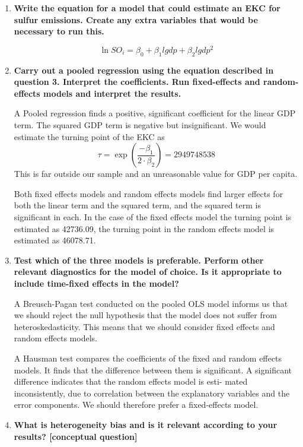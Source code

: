 \documentclass{scrartcl}
\begin{document}
\begin{enumerate}
	\item \textbf{Write the equation for a model that could estimate an EKC for sulfur emissions. Create any extra variables that would be necessary to run this.}
	
	\[ \ln{SO_i} = \beta_0 + \beta_1 lgdp + \beta_2 lgdp^2\]
	
	
	\item \textbf{Carry out a pooled regression using the equation described in question 3. Interpret the coefficients. Run fixed-effects and random-effects models and interpret the results.}

	
	
	A Pooled regression finds a positive, significant coefficient for the linear GDP term. The squared GDP term is negative but insignificant. We would estimate the turning point of the EKC as \[ \tau = \exp\left(\frac{-\beta_1}{2\cdot\beta_2}\right) = 2949748538 \] This is far outside our sample and an unreasonable value for GDP per capita.

	Both fixed effects models and random effects models find larger effects for both the linear term and the squared term, and the squared term is significant in each. In the case of the fixed effects model the turning point is estimated as 42736.09, the turning point in the random effects model is estimated as 46078.71.
	
	\item \textbf{Test which of the three models is preferable. Perform other relevant diagnostics for the model of choice. Is it appropriate to include time-fixed effects in the model?}
	
	
	
	A Breusch-Pagan test conducted on the pooled OLS model informs us that we should reject the null hypothesis that the model does not suffer from heteroskedasticity. This means that we should consider fixed effects and random effects models.
	
	A Hausman test compares the coefficients of the fixed and random effects models. It finds that the difference between them is significant. A significant difference indicates that the random effects model is esti-
mated inconsistently, due to correlation between the explanatory variables and the
error components.	We should therefore prefer a fixed-effects model.
	
	\item \textbf{What is heterogeneity bias and is it relevant according to your results? [conceptual question]}
	

\end{enumerate}
\end{document}

